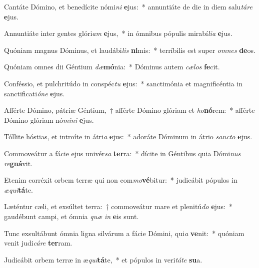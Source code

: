 \item Cantáte Dómino, et benedícite nómi\textit{ni} \textbf{e}jus:~* annuntiáte de die in diem salu\textit{tá}\textit{re} \textbf{e}jus.
\item Annuntiáte inter gentes glóri\textit{am} \textbf{e}jus,~* in ómnibus pópulis mirabí\textit{li}\textit{a} \textbf{e}jus.
\item Quóniam magnus Dóminus, et laudábi\textit{lis} \textbf{ni}mis:~* terríbilis est super \textit{om}\textit{nes} \textbf{de}os.
\item Quóniam omnes dii Géntium \textit{dæ}\textbf{mó}nia:~* Dóminus autem \textit{cæ}\textit{los} \textbf{fe}cit.
\item Conféssio, et pulchritúdo in conspéc\textit{tu} \textbf{e}jus:~* sanctimónia et magnificéntia in sanctificati\textit{ó}\textit{ne} \textbf{e}jus.
\item Afférte Dómino, pátriæ Géntium,~† afférte Dómino glóriam et \textit{ho}\textbf{nó}rem:~* afférte Dómino glóriam nó\textit{mi}\textit{ni} \textbf{e}jus.
\item Tóllite hóstias, et introíte in átri\textit{a} \textbf{e}jus:~* adoráte Dóminum in átrio \textit{sanc}\textit{to} \textbf{e}jus.
\item Commoveátur a fácie ejus univér\textit{sa} \textbf{ter}ra:~* dícite in Géntibus quia Dómi\textit{nus} \textit{re}\textbf{gná}vit.
\item Etenim corréxit orbem terræ qui non com\textit{mo}\textbf{vé}bitur:~* judicábit pópulos in \textit{æ}\textit{qui}\textbf{tá}te.
\item Læténtur cæli, et exsúltet terra:~† commoveátur mare et plenitú\textit{do} \textbf{e}jus:~* gaudébunt campi, et ómnia \textit{quæ} \textit{in} \textbf{e}is sunt.
\item Tunc exsultábunt ómnia ligna silvárum a fácie Dómini, qui\textit{a} \textbf{ve}nit:~* quóniam venit judi\textit{cá}\textit{re} \textbf{ter}ram.
\item Judicábit orbem terræ in æ\textit{qui}\textbf{tá}te,~* et pópulos in veri\textit{tá}\textit{te} \textbf{su}a.
